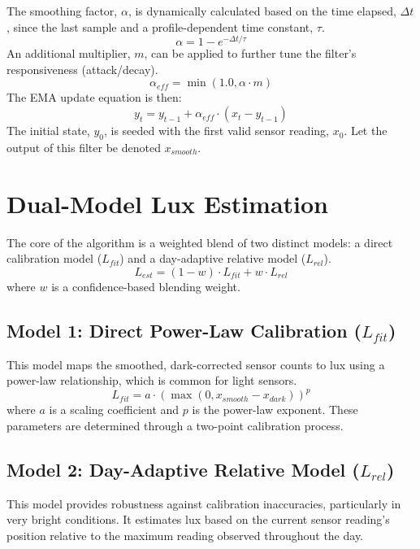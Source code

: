 \documentclass{article}
\begin{document}
The smoothing factor, $\alpha$, is dynamically calculated based on the time elapsed, $\Delta t$, since the last sample and a profile-dependent time constant, $\tau$.
\begin{equation}
    \alpha = 1 - e^{-\Delta t / \tau}
\end{equation}
An additional multiplier, $m$, can be applied to further tune the filter's responsiveness (attack/decay).
\begin{equation}
    \alpha_{eff} = \min(1.0, \alpha \cdot m)
\end{equation}
The EMA update equation is then:
\begin{equation}
    y_t = y_{t-1} + \alpha_{eff} \cdot (x_t - y_{t-1})
\end{equation}
The initial state, $y_0$, is seeded with the first valid sensor reading, $x_0$. Let the output of this filter be denoted $x_{smooth}$.

\section{Dual-Model Lux Estimation}
The core of the algorithm is a weighted blend of two distinct models: a direct calibration model ($L_{fit}$) and a day-adaptive relative model ($L_{rel}$).
\begin{equation}
    L_{est} = (1 - w) \cdot L_{fit} + w \cdot L_{rel}
\end{equation}
where $w$ is a confidence-based blending weight.

\subsection{Model 1: Direct Power-Law Calibration ($L_{fit}$)}
This model maps the smoothed, dark-corrected sensor counts to lux using a power-law relationship, which is common for light sensors.
\begin{equation}
    L_{fit} = a \cdot (\max(0, x_{smooth} - x_{dark}))^p
\end{equation}
where $a$ is a scaling coefficient and $p$ is the power-law exponent. These parameters are determined through a two-point calibration process.

\subsection{Model 2: Day-Adaptive Relative Model ($L_{rel}$)}
This model provides robustness against calibration inaccuracies, particularly in very bright conditions. It estimates lux based on the current sensor reading's position relative to the maximum reading observed throughout the day.
\end{document}

